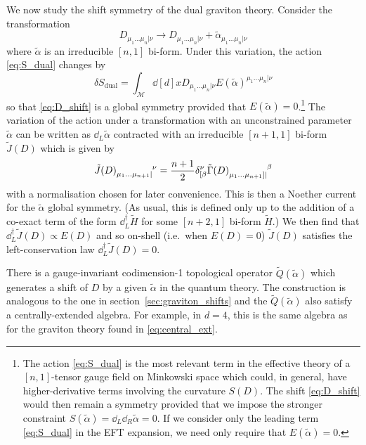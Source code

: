 We now study the shift symmetry of the dual graviton theory.
Consider the transformation
\begin{equation}\label{eq:D_shift}
    D_{\mu_1\dots\mu_n|\nu} \to D_{\mu_1\dots\mu_n|\nu} + \tilde{\alpha}_{\mu_1\dots\mu_n|\nu}
\end{equation}
where $\tilde{\alpha}$ is an irreducible $[n,1]$ bi-form. Under this variation, the action \eqref{eq:S_dual} changes by
\begin{equation}
    \delta S_{\text{dual}} = \int_{\mathcal{M}} \dd[d]{x} D_{\mu_1\dots\mu_n|\nu} E(\tilde{\alpha})^{\mu_1\dots\mu_n|\nu}
\end{equation}
so that \eqref{eq:D_shift} is a global symmetry provided that $E(\tilde{\alpha})=0$.\footnote{The action \eqref{eq:S_dual} is the most relevant term in the effective theory of a $[n,1]$-tensor gauge field on Minkowski space which could, in general, have higher-derivative terms involving the curvature $S(D)$. The shift \eqref{eq:D_shift} would then  remain a symmetry provided that we impose the stronger constraint $S(\tilde{\alpha}) = \dd_L \dd_R \tilde{\alpha} = 0$. If we consider only the leading term \eqref{eq:S_dual} in the EFT expansion, we need only require that $E(\tilde{\alpha})=0$.}
The variation of the action under a transformation with an unconstrained parameter $\tilde{\alpha}$ can be written as $\dd_L\tilde \alpha$ contracted with an irreducible $[n+1,1]$ bi-form $\tilde{J}(D)$
which is given by
\begin{equation}\label{eq:Jtilde_D}
    \tilde{J}(D)\indices{_{\mu_1\dots\mu_{n+1}|}^\nu} = \frac{n+1}{2} \delta^\nu_{[\beta} \tilde{\Gamma}(D)\indices{_{\mu_1\dots\mu_{n+1}]|}^\beta}
\end{equation}
with a normalisation chosen for later convenience.
This is then a Noether current for the $\tilde \alpha$ global symmetry.
(As usual, this is defined only up to the addition of a co-exact term of the form $\dd_L^\dagger \tilde{H}$ for some $[n+2,1]$ bi-form $\tilde{H}$.)
We then find that $\dd_L^\dag \tilde{J}(D) \propto E(D)$ and so on-shell
(i.e.\ when $E(D)=0$) $\tilde{J}(D)$ satisfies the left-conservation law
$\dd_L^\dag \tilde{J}(D)=0$.

There is a gauge-invariant codimension-1 topological operator $\tilde{Q}(\tilde{\alpha})$ which generates a shift of $D$ by a given $\tilde{\alpha}$ in the quantum theory. The construction is analogous to the one in section~\ref{sec:graviton_shifts} and the $\tilde{Q}(\tilde{\alpha})$ also satisfy a centrally-extended algebra. For example, in $d=4$, this is the same algebra as for the graviton theory found in \eqref{eq:central_ext}.


